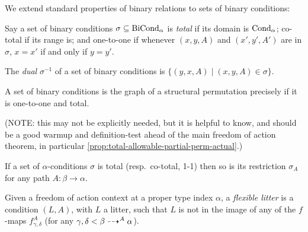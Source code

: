 \begin{definition}
  \label{def:condition-total-1-1}
  We extend standard properties of binary relations to sets of binary conditions:

  Say a set of binary conditions $\sigma \subseteq \mathrm{BiCond}_\alpha$ is \emph{total} if its domain is $\mathrm{Cond}_\alpha$; co-total if its range is; and one-to-one if whenever $(x,y,A)$ and $(x',y',A')$ are in $\sigma$, $x = x'$ if and only if $y = y'$.

  The \emph{dual} $\sigma^{-1}$ of a set of binary conditions is $\{ (y,x,A) \mid (x,y,A) \in \sigma \}$.
\end{definition}

\begin{proposition}
  \label{prop:total-1-1-gives-perm}
  A set of binary conditions is the graph of a structural permutation precisely if it is one-to-one and total.

  (NOTE: this may not be explicitly needed, but it is helpful to know, and should be a good warmup and definition-test ahead of the main freedom of action theorem, in particular \cref{prop:total-allowable-partial-perm-actual}.)
\end{proposition}

\begin{proposition}
  \label{prop:total-1-1-restriction}
  If a set of $\alpha$-conditions $\sigma$ is total (resp.\ co-total, 1-1) then so is its restriction $\sigma_A$ for any path $A : \beta \to \alpha$.
\end{proposition}

\begin{definition}
  \label{def:flexible-condition}
  Given a freedom of action context at a proper type index $\alpha$, a \emph{flexible litter} is a condition $(L,A)$, with $L$ a litter, such that $L$ is not in the image of any of the $f$-maps $f^A_{\gamma,\delta}$ (for any $\gamma,\delta < \beta \dashrightarrow^A \alpha$).
\end{definition}

